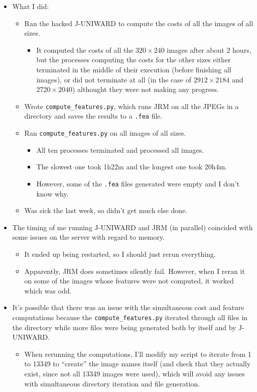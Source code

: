 \documentclass[11pt,a4paper]{report}
\begin{document}
\begin{itemize}

\item What I did:
  \begin{itemize}
  \item Ran the hacked J-UNIWARD to compute the costs of all the images of all sizes.
    \begin{itemize}
    \item It computed the costs of all the $320 \times 240$ images after about 2 hours, but the processes computing the costs for the other sizes either terminated in the middle of their execution (before finishing all images), or did not terminate at all (in the case of $2912 \times 2184$ and $2720 \times 2040$) althought they were not making any progress.
    \end{itemize}

  \item Wrote \texttt{compute\_features.py}, which runs JRM on all the JPEGs in a directory and saves the results to a \texttt{.fea} file.
  
  \item Ran \texttt{compute\_features.py} on all images of all sizes.
    \begin{itemize}
    \item All ten processes terminated and processed all images.
    \item The slowest one took 1h22m and the longest one took 20h4m.
    \item However, some of the \texttt{.fea} files generated were empty and I don't know why.
    \end{itemize}

  \item Was sick the last week, so didn't get much else done.
  \end{itemize}

\item The timing of me running J-UNIWARD and JRM (in parallel) coincided with some issues on the server with regard to memory.
  \begin{itemize}
  \item It ended up being restarted, so I should just rerun everything.
  \item Apparently, JRM does sometimes silently fail. However, when I reran it on some of the images whose features were not computed, it worked which was odd.
  \end{itemize}

\item It's possible that there was an issue with the simultaneous cost and feature computations because the \texttt{compute\_features.py} iterated through all files in the directory while more files were being generated both by itself and by J-UNIWARD.
  \begin{itemize}
  \item When rerunning the computations, I'll modify my script to iterate from 1 to 13349 to ``create'' the image names itself (and check that they actually exist, since not all 13349 images were used), which will avoid any issues with simultaneous directory iteration and file generation.
  \end{itemize}


\end{itemize}
\end{document}
